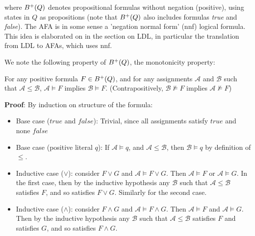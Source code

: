 \noindent where $B^{+}(Q)$ denotes propositional formulas without negation (positive), using states in $Q$ as propositions (note that $B^{+}(Q)$ also includes formulas \textit{true} and \textit{false}). The AFA is in some sense a 'negation normal form' (nnf) logical formula. This idea is elaborated on in the section on LDL, in particular the translation from LDL to AFAs, which uses nnf.

We note the following property of $B^{+}(Q)$, the monotonicity property:

\newcommand{\assA}{\mathcal{A}}
\newcommand{\assB}{\mathcal{B}}
\begin{lem} \label{lem:monotonic-posbool}
For any positive formula $F \in B^{+}(Q)$, and for any assignments $\assA$ and $\assB$ such that $\assA \leq \assB$, $\assA \models F$ implies $\assB \models F$. (Contrapositively, $\assB \not\models F$ implies $\assA \not\models F$)
\end{lem}
\newcommand{\assC}{\mathcal{C}}
\textbf{Proof}: By induction on structure of the formula:
\begin{itemize}
\item Base case ($true$ and $false$): Trivial, since all assignments satisfy $true$ and none $false$
\item Base case (positive literal $q$): If $\assA \models q$, and $\assA \leq \assB$, then $\assB \models q$ by definition of $\leq$.
\item Inductive case ($\lor$): consider $F \lor G$ and $\assA \models F \lor G$. Then $\assA \models F$ or $\assA \models G$. In the first case, then by the inductive hypothesis any $\assB$ such that $\assA \leq \assB$ satisfies $F$, and so satisfies $F \lor G$. Similarly for the second case.
\item Inductive case ($\land$): consider $F \land G$ and $\assA \models F \land G$. Then $\assA \models F$ and $\assA \models G$. Then by the inductive hypothesis any $\assB$ such that $\assA \leq \assB$ satisfies $F$ and satisfies $G$, and so satisfies $F \land G$.
\end{itemize}

\begin{comment}
We also have a dual for negative formulae:
\begin{lem}
For any negative formula $F \in \negbool{Q}$, and for any assignments $\assA$ and $\assB$ such that $\assA \geq \assB$, $\assA \models F$ implies $\assB \models F$. (Contrapositively, $\assB \not\models F$ implies $\assA \not\models F$)
\end{lem}

Using both, we can restore the use of $\neg$, (if we adjust our definition of positive and negative formulae) which was actually implicit in $\land$ and $\lor$.
Suppose $\neg F$ is a negative formula, and we know $\assA \models \neg F$. Then $\assA \not\models F$, and $F$ is a positive formula. Using \ref{lem:monotonic-posbool} contrapositively, for any $\assC$ such that $\assC \leq \assA$, $\assC \not\models F$, so $\assC \models \neg F$.
\end{comment}

